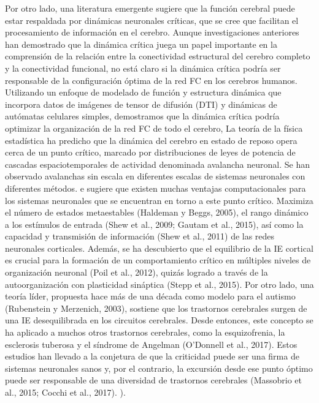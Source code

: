 Por otro lado, una literatura emergente sugiere que la función cerebral puede estar respaldada por dinámicas neuronales críticas, que se cree que facilitan el procesamiento de información en el cerebro. Aunque investigaciones anteriores han demostrado que la dinámica crítica juega un papel importante en la comprensión de la relación entre la conectividad estructural del cerebro completo y la conectividad funcional, no está claro si la dinámica crítica podría ser responsable de la configuración óptima de la red FC en los cerebros humanos. Utilizando un enfoque de modelado de función y estructura dinámica que incorpora datos de imágenes de tensor de difusión (DTI) y dinámicas de autómatas celulares simples, demostramos que la dinámica crítica podría optimizar la organización de la red FC de todo el cerebro, La teoría de la física estadística ha predicho que la dinámica del cerebro en estado de reposo opera cerca de un punto crítico, marcado por distribuciones de leyes de potencia de cascadas espaciotemporales de actividad denominada avalancha neuronal. Se han observado avalanchas sin escala en diferentes escalas de sistemas neuronales con diferentes métodos. e sugiere que existen muchas ventajas computacionales para los sistemas neuronales que se encuentran en torno a este punto crítico. Maximiza el número de estados metaestables (Haldeman y Beggs, 2005), el rango dinámico a los estímulos de entrada (Shew et al., 2009; Gautam et al., 2015), así como la capacidad y transmisión de información (Shew et al., 2011) de las redes neuronales corticales. Además, se ha descubierto que el equilibrio de la IE cortical es crucial para la formación de un comportamiento crítico en múltiples niveles de organización neuronal (Poil et al., 2012), quizás logrado a través de la autoorganización con plasticidad sináptica (Stepp et al., 2015). Por otro lado, una teoría líder, propuesta hace más de una década como modelo para el autismo (Rubenstein y Merzenich, 2003), sostiene que los trastornos cerebrales surgen de una IE desequilibrada en los circuitos cerebrales. Desde entonces, este concepto se ha aplicado a muchos otros trastornos cerebrales, como la esquizofrenia, la esclerosis tuberosa y el síndrome de Angelman (O'Donnell et al., 2017). Estos estudios han llevado a la conjetura de que la criticidad puede ser una firma de sistemas neuronales sanos y, por el contrario, la excursión desde ese punto óptimo puede ser responsable de una diversidad de trastornos cerebrales (Massobrio et al., 2015; Cocchi et al., 2017). ).

